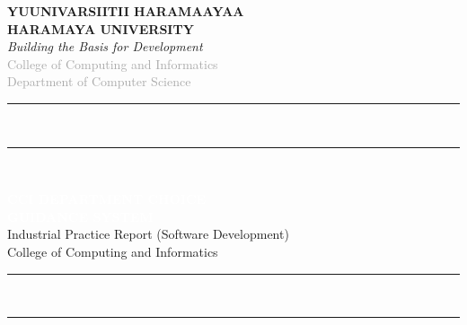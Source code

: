 \documentclass[12pt, a4paper]{article}
\begin{document}
\begin{titlepage}
\begin{center}
{\large\bfseries\textcolor{uniblue}{YUUNIVARSIITII HARAMAAYAA}}\\[0.1cm]
{\Large\bfseries\textcolor{uniblue}{HARAMAYA UNIVERSITY}}\\[0.05cm]
{\small\itshape\textcolor{unigreen}{Building the Basis for Development}}\\[0.3cm]
{\normalsize\textcolor{darkgray}{College of Computing and Informatics}}\\[0.05cm]
{\normalsize\textcolor{darkgray}{Department of Computer Science}}\\[0.3cm]

{\color{uniblue}\rule{0.78\textwidth}{2.5pt}}\\[0.1cm]
{\color{unigreen}\rule{0.78\textwidth}{1pt}}\\[0.3cm]

\begin{tcolorbox}[
    enhanced, colback=uniblue, colframe=accentgold,
    arc=4pt, boxrule=1.5pt, width=0.82\textwidth,
    halign=center, top=10pt, bottom=10pt
]
    {\LARGE\bfseries\textcolor{white}{CCI DEPARTMENT CHOICE}}\\[2pt]
    {\LARGE\bfseries\textcolor{white}{GUIDANCE SYSTEM}}\\[6pt]
    {\normalsize\textcolor{white!80!gray}{Industrial Practice Report (Software Development)}}\\[3pt]
    {\small\textcolor{white!70!gray}{College of Computing and Informatics}}
\end{tcolorbox}

\vspace{0.2cm}
{\color{unigreen}\rule{0.78\textwidth}{1pt}}\\[0.08cm]
{\color{uniblue}\rule{0.78\textwidth}{2.5pt}}\\[0.3cm]


\end{center}
\end{titlepage}
\end{document}
